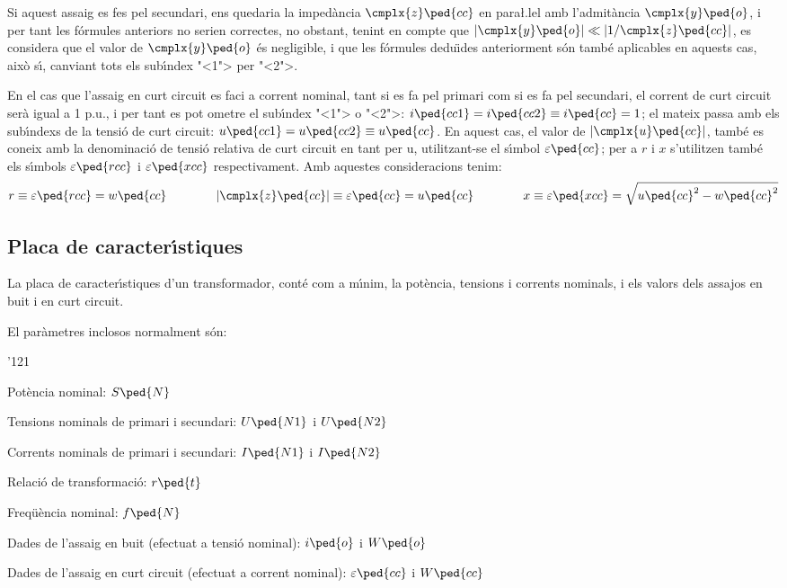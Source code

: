 Si aquest assaig es fes pel secundari, ens quedaria la imped\`{a}ncia
$\cmplx{z}\ped{cc}$ en para{\l.l}el amb l'admit\`{a}ncia
$\cmplx{y}\ped{o}$, i per tant les f\'{o}rmules anteriors no serien
correctes, no obstant, tenint en compte que $|\cmplx{y}\ped{o}| \ll
|1/\cmplx{z}\ped{cc}|$, es considera que el valor de
$\cmplx{y}\ped{o}$ \'{e}s negligible, i que les f\'{o}rmules dedu\"{\i}des
anteriorment s\'{o}n tamb\'{e} aplicables en aquests cas, aix\`{o} s\'{\i}, canviant
tots els sub\'{\i}ndex {"<}1{">} per {"<}2{">}.

En el cas que l'assaig en curt circuit es faci a corrent nominal,
tant  si es fa pel primari  com si es fa pel secundari, el corrent
de curt circuit ser\`{a} igual a 1 p.u., i per tant es pot ometre el
sub\'{\i}ndex {"<}1{">} o {"<}2{">}: $i\ped{cc1} = i\ped{cc2} \equiv i\ped{cc} = 1$;
el mateix passa amb els sub\'{\i}ndexs de la tensi\'{o} de curt circuit:
$u\ped{cc1} = u\ped{cc2} \equiv u\ped{cc}$. En aquest cas, el valor
de $|\cmplx{u}\ped{cc}|$, tamb\'{e} es coneix amb la denominaci\'{o} de
tensi\'{o} relativa de curt  circuit en tant per u, utilitzant-se  el
s\'{\i}mbol $\varepsilon\ped{cc}$; per a $r$ i $x$ s'utilitzen tamb\'{e} els
s\'{\i}mbols $\varepsilon\ped{rcc}$ i $\varepsilon\ped{xcc}$
respectivament. Amb aquestes consideracions tenim:
\begin{equation}
    r \equiv \varepsilon\ped{rcc} = w\ped{cc} \qquad\qquad
    |\cmplx{z}\ped{cc}| \equiv \varepsilon\ped{cc} = u\ped{cc} \qquad\qquad
    x \equiv \varepsilon\ped{xcc} = \sqrt{u\ped{cc}^2 - w\ped{cc}^2}
\end{equation}

\subsection{Placa de caracter\'{\i}stiques}

La placa de caracter\'{\i}stiques d'un transformador, cont\'{e} com a m\'{\i}nim,
la pot\`{e}ncia, tensions i corrents nominals, i els valors dels assajos
en buit i en curt circuit.

El par\`{a}metres inclosos normalment s\'{o}n:
\begin{dinglist}{'121}
   \item Pot\`{e}ncia nominal: $S\ped{N}$
   \item Tensions nominals de primari i secundari:  $U\ped{N1}$ i $U\ped{N2}$
   \item Corrents nominals de primari i secundari:  $I\ped{N1}$ i $I\ped{N2}$
   \item Relaci\'{o} de transformaci\'{o}: $r\ped{t}$
   \item Freq\"{u}\`{e}ncia nominal: $f\ped{N}$
   \item Dades de l'assaig en buit (efectuat a tensi\'{o} nominal):
   $i\ped{o}$ i $W\ped{o}$
   \item Dades de l'assaig en curt circuit (efectuat a corrent nominal):
   $\varepsilon\ped{cc}$ i $W\ped{cc}$
\end{dinglist}

